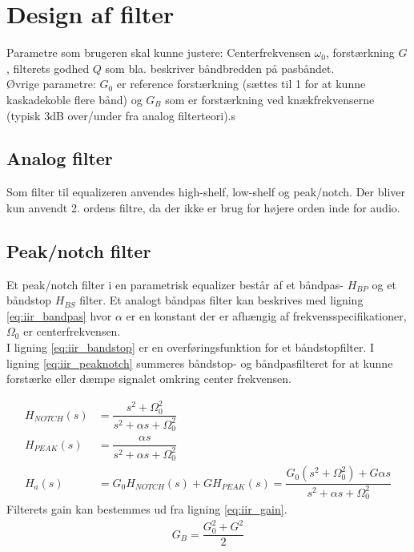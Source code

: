 \section{Design af filter}\label{sec:design_filter}
    Parametre som brugeren skal kunne justere: Centerfrekvensen $\omega_0$,  forstærkning $G$,  filterets godhed $Q$ som bla. beskriver båndbredden på pasbåndet.\\
    Øvrige parametre:
    $G_0$ er reference forstærkning (sættes til 1 for at kunne kaskadekoble flere bånd) og $G_B$ som er forstærkning ved knækfrekvenserne (typisk 3dB over/under fra analog filterteori).s

    \subsection{Analog filter}

	Som filter til equalizeren anvendes high-shelf, low-shelf og  peak/notch.
    Der bliver kun anvendt 2. ordens filtre, da der ikke er brug for højere orden inde for audio. 

     \subsection{Peak/notch filter}

    Et peak/notch filter i en parametrisk equalizer består af et båndpas- $H_{BP}$ og et båndstop $H_{BS}$ filter. 
    Et analogt båndpas filter kan beskrives med ligning \ref{eq:iir_bandpas} 
    hvor $\alpha$ er en konstant der er afhængig af frekvensspecifikationer, $\Omega_0$ er centerfrekvensen.\\
    I ligning \ref{eq:iir_bandstop} er en overføringsfunktion for et båndstopfilter.
    I ligning \ref{eq:iir_peaknotch} summeres båndstop- og båndpasfilteret for at kunne forstærke eller dæmpe signalet omkring center frekvensen.
    
     \begin{align}
     H_{NOTCH}(s) &= \dfrac{s^2 + \Omega_0^2}{s^2 + \alpha s + \Omega_0^2}
     \label{eq:iir_bandpas} \\
     H_{PEAK} (s) &= \dfrac{\alpha s}{s^2 + \alpha s + \Omega_0^2}  
     \label{eq:iir_bandstop} \\
     H_a (s) &= G_0 H_{NOTCH} (s) + G H_{PEAK} (s) = \dfrac{G_0 (s^2 + \Omega_0^2) + G \alpha s}{s^2 + \alpha s + \Omega_0^2}
     \label{eq:iir_peaknotch}
    \end{align}
    Filterets gain kan bestemmes ud fra ligning \ref{eq:iir_gain}.
    \begin{align}
        G_B = \dfrac{G_0^2 + G^2}{2} \label{eq:iir_gain}
    \end{align}

